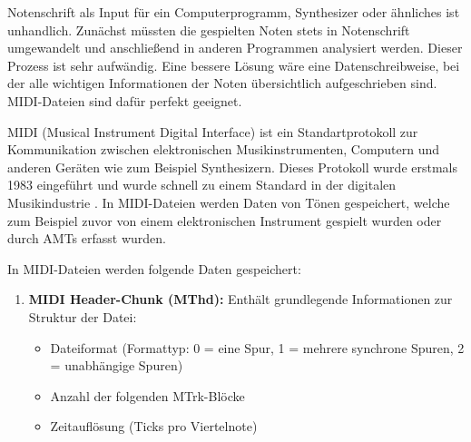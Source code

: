 \begin{description}[style=nextline]
\item[MIDI-Dateien]\label{itm:midi}
Notenschrift als Input für ein Computerprogramm, Synthesizer oder ähnliches ist unhandlich.
Zunächst müssten die gespielten Noten stets in Notenschrift umgewandelt und anschließend in anderen Programmen analysiert werden.
Dieser Prozess ist sehr aufwändig.
Eine bessere Lösung wäre eine Datenschreibweise,
bei der alle wichtigen Informationen der Noten übersichtlich aufgeschrieben sind.
MIDI-Dateien sind dafür perfekt geeignet.

MIDI (Musical Instrument Digital Interface) ist ein Standartprotokoll zur Kommunikation zwischen
elektronischen Musikinstrumenten, Computern und anderen Geräten wie zum Beispiel Synthesizern.
Dieses Protokoll wurde erstmals 1983 eingeführt und wurde schnell zu einem Standard in der digitalen Musikindustrie \cite{smith1983midi}.
In MIDI-Dateien werden Daten von Tönen gespeichert,
welche zum Beispiel zuvor von einem elektronischen Instrument gespielt wurden oder durch AMTs erfasst wurden.

In MIDI-Dateien werden folgende Daten gespeichert:
\begin{enumerate}
    \item \textbf{MIDI Header-Chunk (MThd):} Enthält grundlegende Informationen zur Struktur der Datei:
    \begin{itemize}
        \item Dateiformat (Formattyp: 0 = eine Spur, 1 = mehrere synchrone Spuren, 2 = unabhängige Spuren)
        \item Anzahl der folgenden MTrk-Blöcke
        \item Zeitauflösung (Ticks pro Viertelnote)
    \end{itemize}


\end{enumerate}
\end{description}
